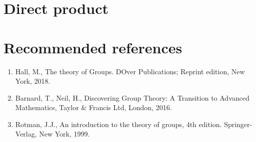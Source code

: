 \documentclass[12pt]{article}
\begin{document}
\newpage
\section{Direct product}


\newpage
\appendix

\section{Recommended references}
	\begin{enumerate}
	\item Hall, M., The theory of Groups. DOver Publications; Reprint edition, New York, 2018.
	\item Barnard, T., Neil, H., Discovering Group Theory: A Transition to Advanced Mathematics, Taylor \& Francis Ltd, London, 2016.
	\item Rotman, J.J., An introduction to the theory of groups, 4th edition. Springer-Verlag, New York, 1999.
	\end{enumerate}
\end{document}
